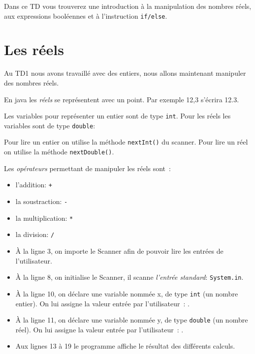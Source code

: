 \documentclass[a4paper,11pt]{article}
\date{2018 -- 2019}
\begin{document}
\entete
\titre
{}
\lastedit


	Dans ce TD vous trouverez une introduction à la manipulation des nombres réels,
	aux expressions booléennes et à l'instruction \texttt{if/else}.
	\tableofcontents

	\newpage

\section{Les réels}


	Au TD1 nous avons travaillé avec des entiers, nous allons maintenant 
	manipuler des nombres réels.

	En java les \emph{réels} se représentent avec un point. 
	Par exemple 12,3 s'écrira 12.3.

	Les variables pour représenter un entier sont de type \texttt{int}.
	Pour les réels les variables sont de type \texttt{double}:
	

	Pour lire un entier on utilise la méthode \texttt{nextInt()} du scanner.
	Pour lire un réel on utilise la méthode \texttt{nextDouble()}.
	


	Les \emph{opérateurs} permettant de manipuler les réels sont~:
	\begin{itemize}
		\item l'addition: \texttt{+}
		\item la soustraction: \texttt{-}
		\item la multiplication: \texttt{*}
		\item la division: \texttt{/}
	\end{itemize} 

	\bigskip

	\begin{itemize}
		\item \`A la ligne 3, on importe le Scanner afin de pouvoir lire les entrées de l'utilisateur.
		\item \`A la ligne 8, on initialise le Scanner, il scanne \emph{l'entrée standard}: 
			\texttt{System.in}.

		\item \`A la ligne 10, on déclare une variable nommée x, de type \texttt{int} (un nombre entier). 
			On lui assigne la valeur entrée par l'utilisateur~: .

		\item \`A la ligne 11, on déclare une variable nommée y, de type \texttt{double} (un nombre réel).
			On lui assigne la valeur entrée par l'utilisateur~: .

		\item Aux lignes 13 à 19 le programme affiche le résultat des différents calculs.

	\end{itemize}
\end{document}
